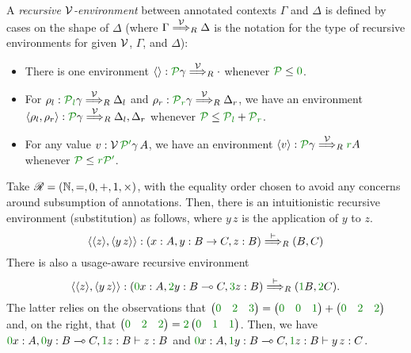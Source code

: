 \begin{definition}\label{def:lr-rec-env}
  A \emph{recursive $\mathcal V$-environment} between annotated contexts $\Gamma$ and
  $\Delta$ is defined by cases on the shape of $\Delta$ (where
  $\Gamma \stackrel{\mathcal V}\Longrightarrow_R \Delta$ is the notation for the
  type of recursive environments for given $\mathcal V$, $\Gamma$, and $\Delta$):
  \begin{itemize}
    \item There is one environment $\alr{} : \grP\gamma \env\V_R {\cdot}$
      whenever $\grP \leq \gr0$.
    \item For $\rho_l : \grPl\gamma \env\V_R \Delta_l$ and
      $\rho_r : \grPr\gamma \env\V_R \Delta_r$, we have an environment
      $\alr{\rho_l, \rho_r} : \grP\gamma \env\V_R \Delta_l, \Delta_r$ whenever
      $\grP \leq \grPl + \grPr$.
    \item For any value $v : \V\,\grPprime\gamma\,A$, we have an environment
      $\alr{v} : \grP\gamma \env\V_R \gr rA$ whenever
      $\grP \leq \gr r\grPprime$.
  \end{itemize}
\end{definition}

\begin{example}\label{ex:rec-sub}
  Take $\Ann = \plr{\mathbb N, =, 0, +, 1, \times}$, with the equality order
  chosen to avoid any concerns around subsumption of annotations.
  Then, there is an intuitionistic recursive environment (substitution) as
  follows, where $y\,z$ is the application of $y$ to $z$.
  \[
    \alr{\alr{z},\alr{y\,z}} :
    \plr{x : A, y : B \to C, z : B} \env\vdash_R \plr{B, C}
  \]
  There is also a usage-aware recursive environment
  \[
    \alr{\alr{z},\alr{y\,z}} :
    \plr{\gr0x : A, \gr2y : B \multimap C, \gr3z : B} \env\vdash_R
    \plr{\gr1B, \gr2C}.
  \]
  The latter relies on the observations that
  $\begin{pmatrix} \gr0 & \gr2 & \gr3 \end{pmatrix} =
  \begin{pmatrix} \gr0 & \gr0 & \gr1 \end{pmatrix}
  + \begin{pmatrix} \gr0 & \gr2 & \gr2 \end{pmatrix}$ and, on the right, that
  $\begin{pmatrix} \gr0 & \gr2 & \gr2 \end{pmatrix} =
  \gr2\begin{pmatrix} \gr0 & \gr1 & \gr1 \end{pmatrix}$.
  Then, we have $\gr0x : A, \gr0y : B \multimap C, \gr1z : B \vdash z : B$ and
  $\gr0x : A, \gr1y : B \multimap C, \gr1z : B \vdash y\,z : C$.
\end{example}

